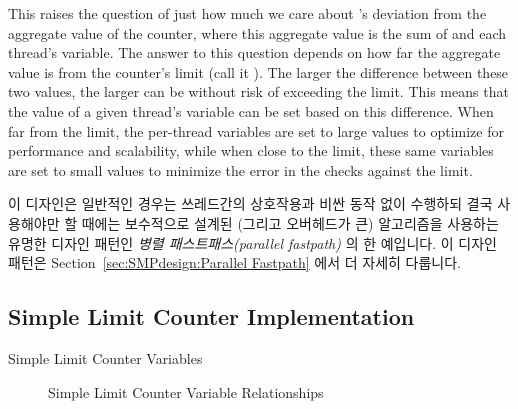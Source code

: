 \begin{lineref}
This raises the question of just how much we care about 's
deviation from the aggregate value of the counter, where this aggregate value
is the sum of  and each thread's  variable.
The answer to this question depends on how far the aggregate value is
from the counter's limit (call it ).
The larger the difference between these two values, the larger 
can be without risk of exceeding the  limit.
This means that the
value of a given thread's  variable can be set
based on this difference.
When far from the limit, the  per-thread variables are
set to large values to optimize for performance and scalability, while
when close to the limit, these same variables are set to small values
to minimize the error in the checks against the  limit.
\fi

이 디자인은 일반적인 경우는 쓰레드간의 상호작용과 비싼 동작 없이 수행하되 결국
사용해야만 할 때에는 보수적으로 설계된 (그리고 오버헤드가 큰) 알고리즘을
사용하는 유명한 디자인 패턴인 \emph{병렬 패스트패스(parallel fastpath)} 의 한
예입니다.
이 디자인 패턴은 Section~\ref{sec:SMPdesign:Parallel Fastpath} 에서 더 자세히
다룹니다.

\subsection{Simple Limit Counter Implementation}
\label{sec:count:Simple Limit Counter Implementation}
\NoIndentAfterThis

\begin{listing}[tbp]

\caption{Simple Limit Counter Variables}
\label{lst:count:Simple Limit Counter Variables}
\end{listing}

\begin{figure}[tb]
\centering
{}
\caption{Simple Limit Counter Variable Relationships}
\label{fig:count:Simple Limit Counter Variable Relationships}
\end{figure}


\end{lineref}
